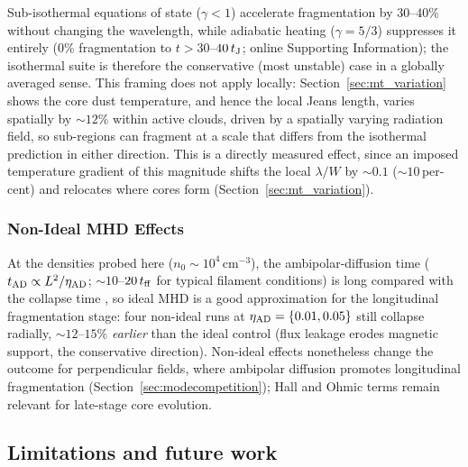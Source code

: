 \documentclass[usenatbib,twoside,twocolumn]{mnras}
\begin{document}
Sub-isothermal equations of state ($\gamma<1$) accelerate fragmentation by $30$--$40\%$ without changing the wavelength, while adiabatic heating ($\gamma=5/3$) suppresses it entirely (0\% fragmentation to $t>30$--$40\,t_{\rm J}$; online Supporting Information); the isothermal suite is therefore the conservative (most unstable) case in a globally averaged sense. This framing does not apply locally: Section~\ref{sec:mt_variation} shows the core dust temperature, and hence the local Jeans length, varies spatially by $\sim12\%$ within active clouds, driven by a spatially varying radiation field, so sub-regions can fragment at a scale that differs from the isothermal prediction in either direction. This is a directly measured effect, since an imposed temperature gradient of this magnitude shifts the local $\lambda/W$ by $\sim0.1$ ($\sim10$\,per-cent) and relocates where cores form (Section~\ref{sec:mt_variation}).

\subsubsection{Non-Ideal MHD Effects}
\label{sec:nonideal}

At the densities probed here ($n_0\sim10^4$\,cm$^{-3}$), the ambipolar-diffusion time ($t_{\rm AD}\propto L^2/\eta_{\rm AD}$; $\sim10$--$20\,t_{\rm ff}$ for typical filament conditions) is long compared with the collapse time \citep{Tassis2004}, so ideal MHD is a good approximation for the longitudinal fragmentation stage: four non-ideal runs at $\eta_{\rm AD}=\{0.01,0.05\}$ still collapse radially, $\sim12$--$15\%$ \textit{earlier} than the ideal control (flux leakage erodes magnetic support, the conservative direction). Non-ideal effects nonetheless change the outcome for perpendicular fields, where ambipolar diffusion promotes longitudinal fragmentation (Section~\ref{sec:modecompetition}); Hall and Ohmic terms remain relevant for late-stage core evolution.

\subsection{Limitations and future work}
\label{sec:limitations}
\end{document}
